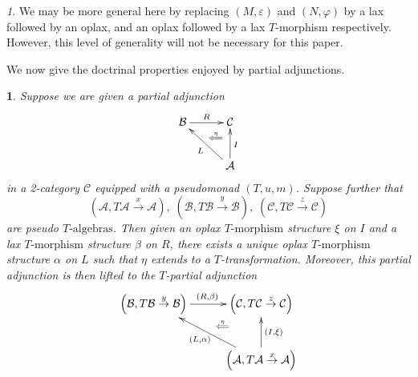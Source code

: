 \documentclass[a4paper,oneside,english]{amsart}
\numberwithin{equation}{section}
\numberwithin{figure}{section}
\theoremstyle{plain}
\theoremstyle{definition}
\theoremstyle{remark}
\newtheorem{rem}[thm]{\protect\remarkname}
\theoremstyle{definition}
\theoremstyle{plain}
\newtheorem{prop}[thm]{\protect\propositionname}
\theoremstyle{plain}
\theoremstyle{plain}
\providecommand{\propositionname}{Proposition}
\providecommand{\remarkname}{Remark}
\begin{document}
\begin{rem}
We may be more general here by replacing $\left(M,{\varepsilon}\right)$
and $\left(N,\varphi\right)$ by a lax followed by an oplax, and an
oplax followed by a lax $T$-morphism respectively. However, this
level of generality will not be necessary for this paper.
\end{rem}
We now give the doctrinal properties enjoyed by partial adjunctions.
\begin{prop}
\label{docparadj} Suppose we are given a partial adjunction
\[
\xymatrix@=1em{\mathcal{B}\ar[rr]^{R} &  & \mathcal{C}\ar@{}[ld]|-{\stackrel{\eta}{\Longleftarrow}}\\
 & \;\\
 &  & \mathcal{A}\ar[uu]_{I}\ar[uull]^{L}
}
\]
in a 2-category $\mathscr{C}$ equipped with a pseudomonad $\left(T,u,m\right)$.
Suppose further that 
\[
\left(\mathcal{A},T\mathcal{A}\stackrel{x}{\longrightarrow}\mathcal{A}\right),\;\left(\mathcal{B},T\mathcal{B}\stackrel{y}{\longrightarrow}\mathcal{B}\right),\;\left(\mathcal{C},T\mathcal{C}\stackrel{z}{\longrightarrow}\mathcal{C}\right)
\]
are pseudo $T\text{-algebras}$. Then given an oplax $T\text{-morphism}$
structure $\xi$ on $I$ and a lax $T\text{-morphism}$ structure
$\beta$ on $R$, there exists a unique oplax $T\text{-morphism}$
structure $\alpha$ on $L$ such that $\eta$ extends to a $T$-transformation.
Moreover, this partial adjunction is then lifted to the $T$-partial
adjunction
\[
\xymatrix@=1em{\left(\mathcal{B},T\mathcal{B}\overset{y}{\rightarrow}\mathcal{B}\right)\ar[rr]^{\left(R,\beta\right)} &  & \left(\mathcal{C},T\mathcal{C}\overset{z}{\rightarrow}\mathcal{C}\right)\ar@{}[ld]|-{\stackrel{\eta}{\Longleftarrow}}\\
 & \;\\
 &  & \left(\mathcal{A},T\mathcal{A}\overset{x}{\rightarrow}\mathcal{A}\right)\ar[uu]_{\left(I,\xi\right)}\ar[uull]^{\left(L,\alpha\right)}
}
\]
\end{prop}
\end{document}
